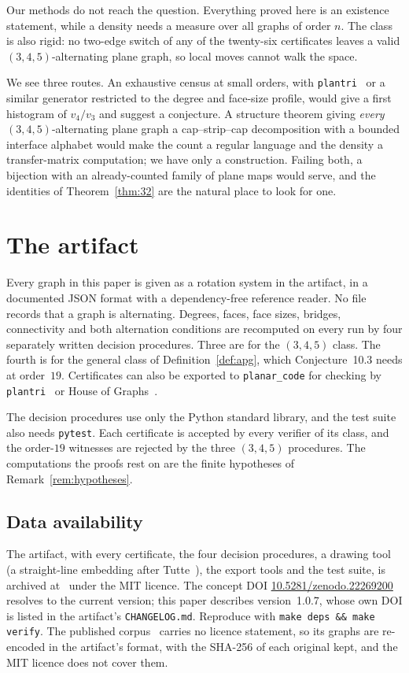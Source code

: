 \documentclass[11pt,a4paper]{amsart}
\theoremstyle{plain}
\theoremstyle{definition}
\newcommand{\artifactversion}{1.0.7}
\begin{document}
Our methods do not reach the question. Everything proved here is an existence
statement, while a density needs a measure over all graphs of order $n$. The
class is also rigid: no two-edge switch of any of the twenty-six certificates
leaves a valid $(3,4,5)$-alternating plane graph, so local moves cannot walk the
space.

We see three routes. An exhaustive census at small orders, with
\texttt{plantri}~\cite{plantri} or a similar generator restricted to the degree
and face-size profile, would give a first histogram of $v_4/v_3$ and suggest a
conjecture. A structure theorem giving \emph{every} $(3,4,5)$-alternating plane
graph a cap--strip--cap decomposition with a bounded interface alphabet would
make the count a regular language and the density a transfer-matrix
computation; we have only a construction. Failing both, a
bijection with an already-counted family of plane maps would serve, and the
identities of Theorem~\ref{thm:32} are the natural place to look for one.

\section{The artifact}\label{sec:artifact}

Every graph in this paper is given as a rotation system in the artifact, in a
documented JSON format with a dependency-free reference reader. No file records
that a graph is alternating. Degrees, faces, face sizes, bridges, connectivity
and both alternation conditions are recomputed on every run by four separately
written decision procedures. Three are for the $(3,4,5)$ class. The fourth is
for the general class of Definition~\ref{def:apg}, which Conjecture~10.3 needs
at order~$19$. Certificates can also be exported to \texttt{planar\_code} for
checking by \texttt{plantri}~\cite{plantri} or House of Graphs~\cite{HoG}.

The decision procedures use only the Python standard library, and the test suite also needs \texttt{pytest}. Each
certificate is accepted by every verifier of its class, and the order-$19$
witnesses are rejected by the three $(3,4,5)$ procedures. The computations the
proofs rest on are the finite hypotheses of Remark~\ref{rem:hypotheses}.

\subsection*{Data availability}

The artifact, with every certificate, the four decision procedures, a drawing
tool (a straight-line embedding after Tutte~\cite{Tutte1963}), the export tools
and the test suite, is archived at~\cite{artifact} under the MIT licence. The
concept DOI \href{https://doi.org/10.5281/zenodo.22269200}{10.5281/zenodo.22269200}
resolves to the current version; this paper describes
version~\artifactversion, whose own DOI is listed in the artifact's
\texttt{CHANGELOG.md}.
Reproduce with \texttt{make deps \&\& make verify}. The published
corpus~\cite{APGcorpus} carries no licence statement, so its graphs are
re-encoded in the artifact's format, with the SHA-256 of each original kept, and
the MIT licence does not cover them.
\end{document}
